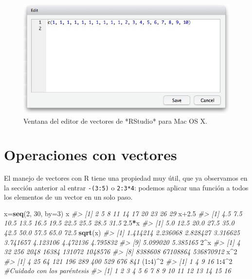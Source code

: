 \documentclass[
]{book}
\newenvironment{Shaded}{\begin{snugshade}}{\end{snugshade}}
\newcommand{\CommentTok}[1]{\textcolor[rgb]{0.56,0.35,0.01}{\textit{#1}}}
\newcommand{\DataTypeTok}[1]{\textcolor[rgb]{0.13,0.29,0.53}{#1}}
\newcommand{\DecValTok}[1]{\textcolor[rgb]{0.00,0.00,0.81}{#1}}
\newcommand{\FloatTok}[1]{\textcolor[rgb]{0.00,0.00,0.81}{#1}}
\newcommand{\KeywordTok}[1]{\textcolor[rgb]{0.13,0.29,0.53}{\textbf{#1}}}
\newcommand{\NormalTok}[1]{#1}
\newcommand{\OperatorTok}[1]{\textcolor[rgb]{0.81,0.36,0.00}{\textbf{#1}}}
\theoremstyle{definition}
\theoremstyle{definition}
\theoremstyle{definition}
\theoremstyle{remark}
\begin{document}
\begin{figure}

{\centering \includegraphics[width=0.9\linewidth]{AprendeR-Parte-I_files/figure-html/finestres0} 

}

\caption{Ventana del editor de vectores de *RStudio* para Mac OS X.}\label{fig:editvect}
\end{figure}

\hypertarget{operaciones-con-vectores}{%
\section{Operaciones con vectores}\label{operaciones-con-vectores}}

El manejo de vectores con R tiene una propiedad muy útil, que ya observamos en la sección anterior al entrar \texttt{-(3:5)} o \texttt{2:3*4}: podemos aplicar una función a todos los elementos de un vector en un solo paso.

\begin{Shaded}
\begin{Highlighting}[]
\NormalTok{x=}\KeywordTok{seq}\NormalTok{(}\DecValTok{2}\NormalTok{, }\DecValTok{30}\NormalTok{, }\DataTypeTok{by=}\DecValTok{3}\NormalTok{)}
\NormalTok{x}
\CommentTok{\#\textgreater{}  [1]  2  5  8 11 14 17 20 23 26 29}
\NormalTok{x}\FloatTok{+2.5}
\CommentTok{\#\textgreater{}  [1]  4.5  7.5 10.5 13.5 16.5 19.5 22.5 25.5 28.5 31.5}
\FloatTok{2.5}\OperatorTok{*}\NormalTok{x}
\CommentTok{\#\textgreater{}  [1]  5.0 12.5 20.0 27.5 35.0 42.5 50.0 57.5 65.0 72.5}
\KeywordTok{sqrt}\NormalTok{(x) }
\CommentTok{\#\textgreater{}  [1] 1.414214 2.236068 2.828427 3.316625 3.741657 4.123106 4.472136 4.795832}
\CommentTok{\#\textgreater{}  [9] 5.099020 5.385165}
\DecValTok{2}\OperatorTok{\^{}}\NormalTok{x}
\CommentTok{\#\textgreater{}  [1]         4        32       256      2048     16384    131072   1048576}
\CommentTok{\#\textgreater{}  [8]   8388608  67108864 536870912}
\NormalTok{x}\OperatorTok{\^{}}\DecValTok{2}
\CommentTok{\#\textgreater{}  [1]   4  25  64 121 196 289 400 529 676 841}
\NormalTok{(}\DecValTok{1}\OperatorTok{:}\DecValTok{4}\NormalTok{)}\OperatorTok{\^{}}\DecValTok{2}
\CommentTok{\#\textgreater{} [1]  1  4  9 16}
\DecValTok{1}\OperatorTok{:}\DecValTok{4}\OperatorTok{\^{}}\DecValTok{2} \CommentTok{\#Cuidado con los paréntesis}
\CommentTok{\#\textgreater{}  [1]  1  2  3  4  5  6  7  8  9 10 11 12 13 14 15 16}
\end{Highlighting}
\end{Shaded}
\end{document}
